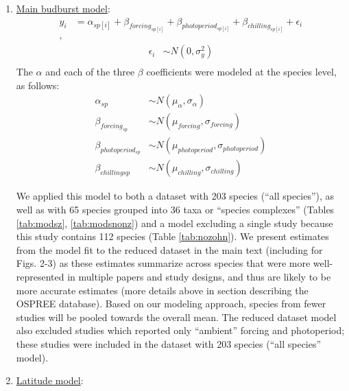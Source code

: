 \documentclass{article}
\begin{document}
\begin{enumerate}
\item \underline{Main budburst model}:
\begin{align*}
y_i &= \alpha_{sp[i]} + \beta_{forcing_{sp[i]}} + \beta_{photoperiod_{sp[i]}} + \beta_{chilling_{sp[i]}} + \epsilon_i\\,
\end{align*}
\begin{align*}
\epsilon_i & \sim N(0,\sigma^2_y) \\
\end{align*}
\noindent The $\alpha$ and each of the three $\beta$ coefficients were modeled at the species level, as follows:
\begin{align*}
\alpha_{sp} & \sim N(\mu_{\alpha}, \sigma_{\alpha}) \\
\beta_{forcing_{sp}} & \sim N(\mu_{forcing}, \sigma_{forcing}) \\
\beta_{photoperiod_{sp}} & \sim N(\mu_{photoperiod}, \sigma_{photoperiod})\\
\beta_{chilling{sp}} & \sim N(\mu_{chilling}, \sigma_{chilling})
\end{align*}

We applied this model to both a dataset with 203 species (``all species''), as well as with 65 species grouped into 36 taxa or ``species complexes'' (Tables \ref{tab:modsz}, \ref{tab:modsnonz}) and a model excluding a single study \citep{zohner2016} because this study contains 112 species (Table \ref{tab:nozohn}). We present estimates from the model fit to the reduced dataset in the main text (including for Figs. 2-3) as these estimates summarize across species that were more well-represented in multiple papers and study designs, and thus are likely to be more accurate estimates (more details above in section describing the OSPREE database). Based on our modeling approach, species from fewer studies will be pooled towards the overall mean. The reduced dataset model also excluded studies which reported only ``ambient'' forcing and photoperiod; these studies were included in the dataset with 203 species (``all species'' model).
\item \underline{Latitude model}:


\end{enumerate}
\end{document}
